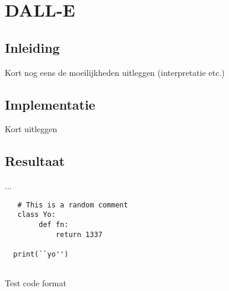 \section{DALL-E}
\subsection{Inleiding}
Kort nog eens de moeilijkheden uitleggen (interpretatie etc.)
\subsection{Implementatie}
Kort uitleggen
\subsection{Resultaat}
...
\begin{listing}[H]
\begin{verbatim}
   # This is a random comment
   class Yo:
        def fn:
            return 1337
   
  print(``yo'')
  
\end{verbatim}
\caption{Test code format}
\end{listing}